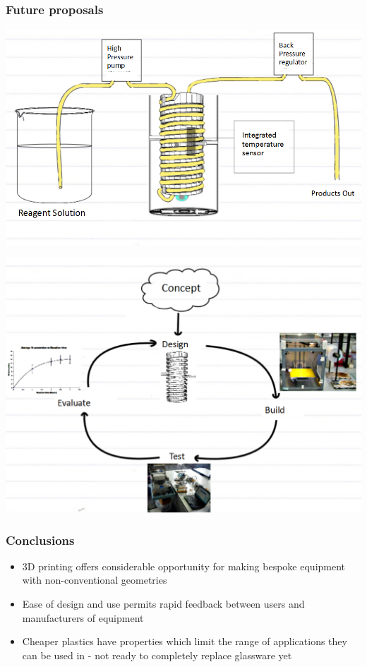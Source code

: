 \documentclass[10pt, compress]{beamer}
\begin{document}
\begin{frame}
\frametitle{Future proposals}
\begin{center}
\includegraphics[width=\textwidth]{suggestedimp.png}
\end{center}

\end{frame}

\begin{frame}
\begin{center}
\includegraphics[width=\textwidth]{iter2.PNG}
\end{center}
\end{frame}

\begin{frame}
\frametitle{Conclusions}

\begin{itemize}
    \item{3D printing offers considerable opportunity for making bespoke equipment with non-conventional geometries}
    \item{Ease of design and use permits rapid feedback between users and manufacturers of equipment}
    \item{Cheaper plastics have properties which limit the range of applications they can be used in - not ready to completely replace glassware yet}
\end{itemize}
\end{frame}
\end{document}
